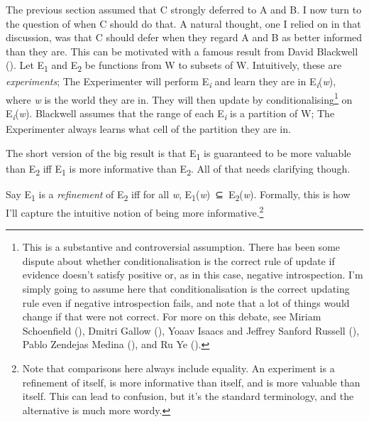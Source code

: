 \documentclass[
  12pt,
  letterpaper,
  DIV=11,
  numbers=noendperiod]{scrartcl}
\begin{document}
The previous section assumed that C strongly deferred to A and B. I now
turn to the question of when C should do that. A natural thought, one I
relied on in that discussion, was that C should defer when they regard A
and B as better informed than they are. This can be motivated with a
famous result from David Blackwell ().
Let E\textsubscript{1} and E\textsubscript{2} be functions from W to
subsets of W. Intuitively, these are \emph{experiments}; The
Experimenter will perform E\textsubscript{\emph{i}} and learn they are
in E\emph{\textsubscript{i}}(\emph{w}), where \emph{w} is the world they
are in. They will then update by conditionalising\footnote{This is a
  substantive and controversial assumption. There has been some dispute
  about whether conditionalisation is the correct rule of update if
  evidence doesn't satisfy positive or, as in this case, negative
  introspection. I'm simply going to assume here that conditionalisation
  is the correct updating rule even if negative introspection fails, and
  note that a lot of things would change if that were not correct. For
  more on this debate, see Miriam Schoenfield
  (), Dmitri Gallow
  (), Yoaav Isaacs and Jeffrey Sanford
  Russell (), Pablo Zendejas Medina
  (), and Ru Ye
  ().} on
E\emph{\textsubscript{i}}(\emph{w}). Blackwell assumes that the range of
each E\textsubscript{\emph{i}} is a partition of W; The Experimenter
always learns what cell of the partition they are in.

The short version of the big result is that E\textsubscript{1} is
guaranteed to be more valuable than E\textsubscript{2} iff
E\textsubscript{1} is more informative than E\textsubscript{2}. All of
that needs clarifying though.

Say E\textsubscript{1} is a \emph{refinement} of E\textsubscript{2} iff
for all \emph{w},
E\textsubscript{1}(\emph{w})~⊆~E\textsubscript{2}(\emph{w}). Formally,
this is how I'll capture the intuitive notion of being more
informative.\footnote{Note that comparisons here always include
  equality. An experiment is a refinement of itself, is more informative
  than itself, and is more valuable than itself. This can lead to
  confusion, but it's the standard terminology, and the alternative is
  much more wordy.}
\end{document}
